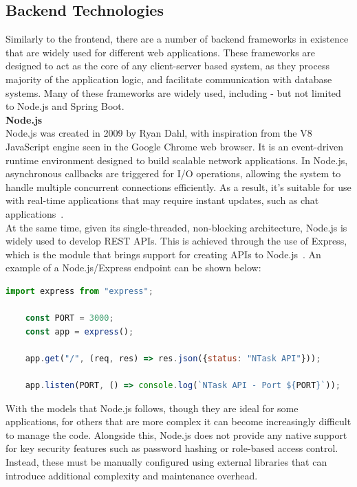 \documentclass[]{final_report}
\begin{document}
\subsection {Backend Technologies}

Similarly to the frontend, there are a number of backend frameworks in existence that are widely used for different web applications. These frameworks are designed to act as the core of any client-server based system, as they process majority of the application logic, and facilitate communication with database systems. Many of these frameworks are widely used, including - but not limited to Node.js and Spring Boot.\\

\textbf{Node.js}\\
Node.js was created in 2009 by Ryan Dahl, with inspiration from the V8 JavaScript engine seen in the Google Chrome web browser. It is an event-driven runtime environment designed to build scalable network applications. In Node.js, asynchronous callbacks are triggered for I/O operations, allowing the system to handle multiple concurrent connections efficiently. As a result, it's suitable for use with real-time applications that may require instant updates, such as chat applications~\cite{BACKEND_FRAMEWORKS_BLOG,BACKEND_FRAMEWORKS_REPORT}.\\ 

At the same time, given its single-threaded, non-blocking architecture, Node.js is widely used to develop REST APIs. This is achieved through the use of Express, which is the module that brings support for creating APIs to Node.js~\cite{NODE_API}. An example of a Node.js/Express endpoint can be shown below:

\begin{lstlisting}[language=javascript, caption={A basic GET endpoint that responds with a JSON object~\cite{NODE_API}}]
	import express from "express";

	const PORT = 3000;
	const app = express();

	app.get("/", (req, res) => res.json({status: "NTask API"}));

	app.listen(PORT, () => console.log(`NTask API - Port ${PORT}`));
\end{lstlisting}

With the models that Node.js follows, though they are ideal for some applications, for others that are more complex it can become increasingly difficult to manage the code. Alongside this, Node.js does not provide any native support for key security features such as password hashing or role-based access control. Instead, these must be manually configured using external libraries that can introduce additional complexity and maintenance overhead.\\
\end{document}
